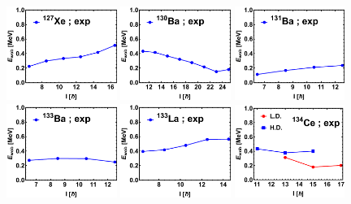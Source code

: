 \begin{figure}
    \centering
    \includegraphics[width=0.32\textwidth]{Chapters/Figures/wobblers/127Xe.pdf}
    \includegraphics[width=0.32\textwidth]{Chapters/Figures/wobblers/130Ba.pdf}
    \includegraphics[width=0.32\textwidth]{Chapters/Figures/wobblers/131Ba.pdf}
    \includegraphics[width=0.32\textwidth]{Chapters/Figures/wobblers/133Ba.pdf}
    \includegraphics[width=0.32\textwidth]{Chapters/Figures/wobblers/133La.pdf}
    \includegraphics[width=0.32\textwidth]{Chapters/Figures/wobblers/134Ce-joint.pdf}

\end{figure}
